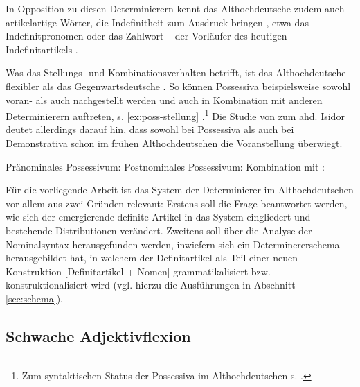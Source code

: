 In Opposition zu diesen  Determinierern kennt das Althochdeutsche zudem auch artikelartige Wörter, die Indefinitheit zum Ausdruck bringen \parencite[vgl. z.B.][253f.]{Braune2004}, etwa das Indefinitpronomen  \parencite{Donhauser2012} oder das Zahlwort  -- der Vorläufer des heutigen Indefinitartikels \parencite{Oubouzar2000,Szczepaniak2016a}. 

Was das Stellungs- und Kombinationsverhalten betrifft, ist das Althochdeutsche  flexibler als das Gegenwartsdeutsche \parencite[vgl.][104]{Szczepaniak2011a}. So können Possessiva beispielsweise sowohl voran- als auch nachgestellt werden und auch in Kombination mit anderen Determinierern auftreten, s. \ref{ex:poss-stellung} \parencite[Beispiele aus][27f.]{Schrodt2004}.\footnote{Zum syntaktischen Status der Possessiva im Althochdeutschen s. \textcite[132ff.]{Demske2001}.} Die Studie von \textcite{Flick2018} zum ahd. Isidor deutet allerdings darauf hin, dass sowohl bei Possessiva als auch bei Demonstrativa schon im frühen Althochdeutschen die Voranstellung überwiegt.

\begin{exe}
	\ex \label{ex:poss-stellung}   
	\begin{xlist}
		\ex \label{ex:possvor} Pränominales Possessivum:  
		\ex \label{ex:possnach} Postnominales Possessivum:   
		\ex \label{ex:posskombi} Kombination mit :  
		\end{xlist}
\end{exe}


Für die vorliegende Arbeit ist das System der Determinierer im Althochdeutschen  vor allem aus zwei Gründen relevant: Erstens soll die Frage beantwortet werden, wie sich der emergierende definite Artikel in das System eingliedert und bestehende Distributionen verändert. Zweitens soll über die Analyse der Nominalsyntax herausgefunden werden, inwiefern sich ein Determinererschema herausgebildet hat, in welchem der Definitartikel als Teil einer neuen Konstruktion [Definitartikel + Nomen] grammatikalisiert bzw. konstruktionalisiert wird (vgl. hierzu die Ausführungen in Abschnitt \ref{sec:schema}). 

\subsection{Schwache Adjektivflexion} \label{schwache-Adjektivflexion}

